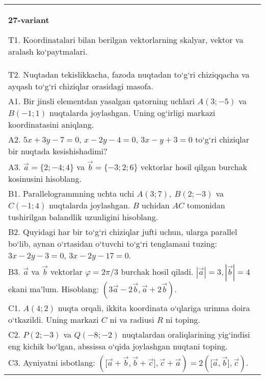 \documentclass{article}
\begin{document}
\begin{tabular}{m{17cm}}
\textbf{27-variant}
\newline

T1. 
Koordinatalari bilan berilgan vektorlarning skalyar, vektor va aralash ko‘paytmalari. \\
T2. 
Nuqtadan tekislikkacha, fazoda nuqtadan to‘g‘ri chiziqqacha va ayqash to‘g‘ri chiziqlar orasidagi masofa. \\
A1. 
Bir jinsli elementdan yasalgan qatorning uchlari
$A (3;-5) $ va $B (-1;1) $ nuqtalarda joylashgan. Uning og‘irligi
markazi koordinatasini aniqlang.
 \\
A2. 
$5x+3y-7=0$, $x-2y-4=0$, $3x-y+3=0$
to‘g‘ri chiziqlar bir nuqtada kesishishadimi?
 \\
A3. 
$\overrightarrow{a} = \{ 2; - 4;4\}$ va $\overrightarrow{b} = \{ - 3;2;6\}$
vektorlar hosil qilgan burchak kosinusini hisoblang.
 \\
B1. 
Parallelogrammning uchta uchi \(A (3;7),\ B (2;-3) \) va
\(C (-1;4) \) nuqtalarda joylashgan. $B$ uchidan $AC$
tomonidan tushirilgan balandlik uzunligini hisoblang.
 \\
B2. 
Quyidagi har bir to‘g‘ri chiziqlar jufti uchun, ularga parallel
bo‘lib, aynan o‘rtasidan o‘tuvchi to‘g‘ri tenglamani tuzing: $3x-2y-3=0$, $3x-2y-17=0$.
 \\
B3. 
$\vec{a}$ va $\vec{b}$ vektorlar $\varphi = 2\pi/3$ burchak hosil qiladi. $|\vec{a}| = 3,|\vec{b}| = 4$ ekani ma’lum. Hisoblang:
$\left(3\vec{a} - 2\vec{b},\vec{a} + 2\vec{b} \right) $.
 \\
C1. \(A (4;2) \) nuqta orqali, ikkita koordinata o‘qlariga
urinma doira o‘tkazildi. Uning markazi $C$ ni va radiusi
$R$ ni toping.
 \\
C2. 
\(P (2; - 3) \) va \(Q (- 8; - 2) \) nuqtalardan
oraliqlarining yig‘indisi eng kichik bo‘lgan, abssissa o‘qida joylashgan
nuqtani toping.
 \\
C3. 
Ayniyatni isbotlang: \((\lbrack\vec{a} + \vec{b},\vec{b} + \vec{c}\rbrack,\vec{c} + \vec{a}) = 2 (\lbrack\vec{a},\vec{b}\rbrack,\vec{c}) \).
 \\

\end{tabular}
\vspace{1cm}
\end{document}
